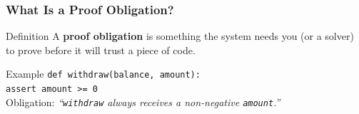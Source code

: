\providecommand{\jugmark}[1]{\textbf{\color{jugeoBlue}#1}}

\begin{frame}
\frametitle{What Is a Proof Obligation?}
\begin{block}{Definition}
  A \jugmark{proof obligation} is something the system needs you (or a solver)
  to prove before it will trust a piece of code.
\end{block}
\vspace{8pt}
\begin{exampleblock}{Example}
  \texttt{def withdraw(balance, amount):}\\
  \quad\texttt{assert amount >= 0}\\[4pt]
  Obligation: \emph{``\texttt{withdraw} always receives a non-negative \texttt{amount}.''}
\end{exampleblock}
\vspace{8pt}
\begin{center}
\end{center}
\end{frame}

